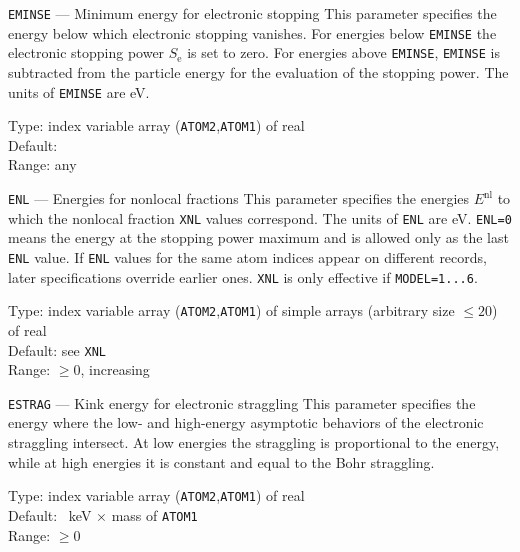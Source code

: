 \begin{keydescription}{\texttt{EMINSE} --- Minimum energy for electronic
    stopping}
%
  This parameter specifies the energy below which electronic stopping
  vanishes. For energies below \texttt{EMINSE} the electronic stopping
  power $S_\mathrm{e}$ is set to zero. For energies above \texttt{EMINSE},
  \texttt{EMINSE} is subtracted from the particle energy for the evaluation
  of the stopping power. The units of \texttt{EMINSE} are eV.
  \begin{keytab}
    Type:    \> index variable array (\texttt{ATOM2},\texttt{ATOM1}) 
                of real \\
    Default:  \\
    Range:   \> any
  \end{keytab}
\end{keydescription}

\begin{keydescription}{\texttt{ENL} --- Energies for nonlocal fractions}
%
  This parameter specifies the energies $E^\mathrm{nl}$ to which the
  nonlocal fraction \texttt{XNL} values correspond. The units of \texttt{ENL}
  are eV. \texttt{ENL=0} means the energy at the stopping power maximum and
  is allowed only as the last \texttt{ENL} value. If \texttt{ENL} values for the
  same atom indices appear on different records, later specifications override
  earlier ones.
  \ifprivate
  \texttt{XNL} is only effective if \texttt{MODEL=1...6}.
  \fi
  \begin{keytab}
    Type:    \> index variable array (\texttt{ATOM2},\texttt{ATOM1}) 
                of simple arrays (arbitrary size $\le 20$) of real \\
    Default: \> see \texttt{XNL} \\
    Range:   \> $\ge 0$, increasing
  \end{keytab}
\end{keydescription}

\begin{keydescription}{\texttt{ESTRAG} --- Kink energy for electronic
    straggling}
%
  This parameter specifies the energy where the low- and high-energy
  asymptotic behaviors of the electronic straggling intersect. At low
  energies the straggling is proportional to the energy, while at high
  energies it is constant and equal to the Bohr straggling.
  \begin{keytab}
    Type:    \> index variable array (\texttt{ATOM2},\texttt{ATOM1}) 
                of real \\
    Default: ~keV $\times$ mass of \texttt{ATOM1} \\
    Range:   \> $\ge 0$
  \end{keytab}
\end{keydescription}

